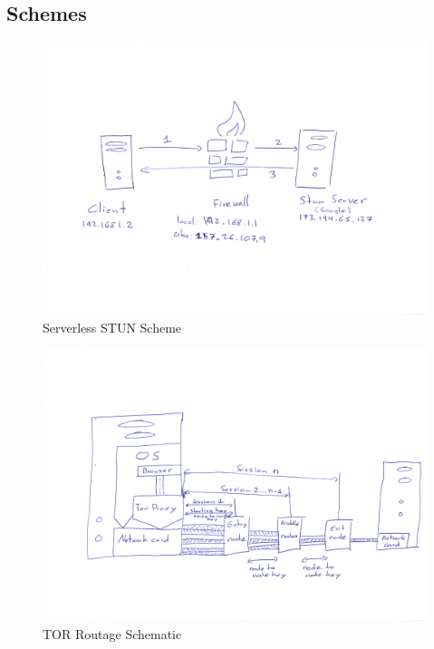 
\subsection{Schemes}

\begin{figure}[htpb]
\centering
\begin{adjustbox}{center}
\includegraphics[scale=0.075]{annexes/schemes/stun-scheme.jpg}
\end{adjustbox}
\caption{Serverless STUN Scheme
\label{fig:stun-scheme}}
\end{figure} 

\begin{figure}[htpb]
\centering
\begin{adjustbox}{center}
\includegraphics[scale=0.075]{annexes/schemes/tor-scheme.jpg}
\end{adjustbox}
\caption{TOR Routage Schematic
\label{fig:tor-scheme}}  
\end{figure}

